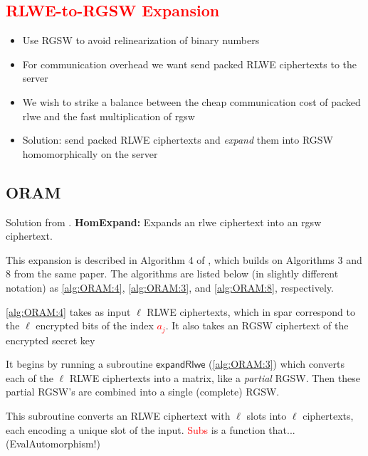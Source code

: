 \textcolor{red}{\section{RLWE-to-RGSW Expansion}}
\begin{itemize}
    \item Use RGSW to avoid relinearization of binary numbers
    \item For communication overhead we want send packed RLWE ciphertexts to the server
    \item We wish to strike a balance between the cheap communication cost of packed \gls{rlwe} and the fast multiplication of \gls{rgsw}
    \item Solution: send packed RLWE ciphertexts and \textit{expand} them into RGSW homomorphically on the server 
\end{itemize}

\subsection{ORAM}
Solution from \autocite{chillotti:onionring:2019}. \textbf{HomExpand:} Expands an \gls{rlwe} ciphertext into an \gls{rgsw} ciphertext.

This expansion is described in Algorithm 4 of \cite{chillotti:onionring:2019}, which builds on Algorithms 3 and 8 from the same paper. The algorithms are listed below (in slightly different notation) as \autoref{alg:ORAM:4}, \autoref{alg:ORAM:3}, and \autoref{alg:ORAM:8}, respectively.



\autoref{alg:ORAM:4} takes as input $\ell$ RLWE ciphertexts, which in \gls{spar} correspond to the $\ell$ encrypted bits of the index \textcolor{red}{$a_j$}. It also takes an RGSW ciphertext of the encrypted secret key %

It begins by running a subroutine $\mathsf{expandRlwe}$ (\autoref{alg:ORAM:3}) which converts each of the $\ell$ RLWE ciphertexts into a matrix, like a \emph{partial} RGSW. Then these partial RGSW's are combined into a single (complete) RGSW.



This subroutine converts an RLWE ciphertext with $\ell$ slots into $\ell$ ciphertexts, each encoding a unique slot of the input. \textcolor{red}{Subs} is a function that... (EvalAutomorphism!)

